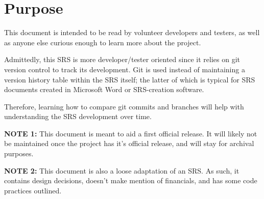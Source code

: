 \section{Purpose}

This document is intended to be read by volunteer developers and testers, as well as anyone else curious enough to learn more about the project.

Admittedly, this SRS is more developer/tester oriented since it relies on git version control to track its development. Git is  used instead of maintaining a version history table within the SRS itself; the latter of which is typical for SRS documents created in Microsoft Word or SRS-creation software.

Therefore, learning how to compare git commits and branches will help with understanding the SRS development over time. 


\textbf{NOTE 1:} This document is meant to aid a first official release. It will likely not be maintained once the project has it's official release, and will stay for archival purposes.

\textbf{NOTE 2:} This document is also a loose adaptation of an SRS. As such, it contains design decisions, doesn't make mention of financials, and has some code practices outlined.